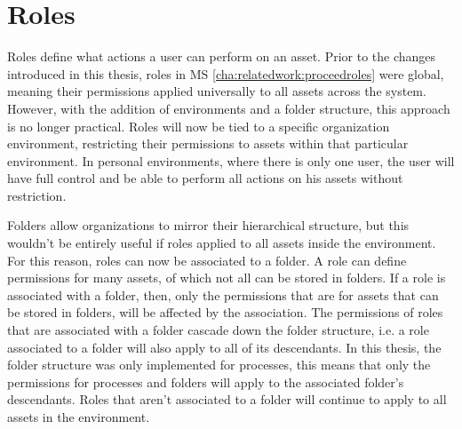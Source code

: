 \section{Roles}
\label{cha:conceptanddesign:roles}

Roles define what actions a user can perform on an asset. Prior to the changes introduced
in this thesis, roles in MS \ref{cha:relatedwork:proceedroles} were global,
meaning their permissions applied universally
to all assets across the system.
However, with the addition of environments and a folder structure, this approach is no longer practical.
Roles will now be tied to a specific organization environment,
restricting their permissions to assets within that particular environment.
In personal environments, where there is only one user, the user will have
full control and be able to perform all actions on his assets without restriction.

Folders allow organizations to mirror their hierarchical structure, but this wouldn't be
entirely useful if roles applied to all assets inside the environment.
For this reason, roles can now be associated to a folder.
%
A role can define permissions for many assets, of which not all can be stored in folders.
If a role is associated with a folder, then, only the permissions that are for assets that
can be stored in folders, will be affected by the association.
%
The permissions of roles that are associated with a folder cascade down the
folder structure, i.e. a role associated to a folder will also apply to all of its
descendants.
In this thesis, the folder structure was only implemented for processes,
this means that only the permissions for processes and folders will apply to the
associated folder's descendants.
Roles that aren't associated to a folder will continue to apply to all assets in the environment.

